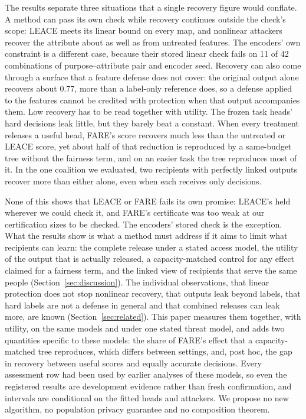 \documentclass[10pt]{article}
\begin{document}
The results separate three situations that a single recovery figure would conflate. A method can pass its own check
while recovery continues outside the check's scope: LEACE meets its linear bound on every map, and nonlinear
attackers recover the attribute about as well as from untreated features. The encoders' own constraint is a different
case, because their stored linear check fails on 11 of 42 combinations of purpose--attribute pair and encoder seed.
Recovery can also come through a surface that a feature defense does not cover: the original output alone recovers about 0.77, more than a label-only reference does, so a defense applied to the
features cannot be credited with protection when that output accompanies them. Low recovery has to be read together with utility. The frozen task heads' hard decisions leak little,
but they barely beat a constant. When every treatment releases a useful head, FARE's score recovers much less than the
untreated or LEACE score, yet about half of that reduction is reproduced by a same-budget tree without the fairness
term, and on an easier task the tree reproduces most of it. In the one coalition we evaluated, two recipients with
perfectly linked outputs recover more than either alone, even when each receives only decisions.

None of this shows that LEACE or FARE fails its own promise: LEACE's held wherever we could check it, and FARE's
certificate was too weak at our certification sizes to be checked. The encoders' stored check is the exception. What
the results show is what a method must address if it aims to limit what recipients can learn: the complete release
under a stated access model, the utility of the output that is actually released, a capacity-matched control for any
effect claimed for a fairness term, and the linked view of recipients that serve the same people
(Section~\ref{sec:discussion}). The individual observations, that linear protection does not stop nonlinear recovery,
that outputs leak beyond labels, that hard labels are not a defense in general and that combined releases can leak
more, are known (Section~\ref{sec:related}). This paper measures them together, with utility, on the same models and
under one stated threat model, and adds two quantities specific to these models: the share of FARE's effect that a
capacity-matched tree reproduces, which differs between settings, and, post hoc, the gap in recovery between useful scores and equally accurate decisions. Every assessment row had been used by earlier analyses of these models, so even the registered results are development evidence rather than fresh confirmation, and intervals are conditional on the fitted heads and
attackers. We propose no new algorithm, no population privacy guarantee and no composition theorem.
\end{document}
